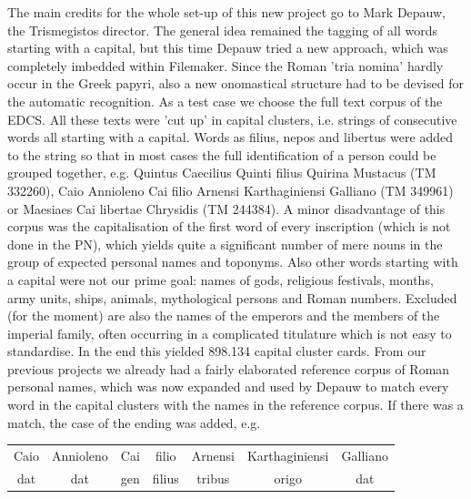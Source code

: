 \documentclass[amsthm,ebook]{saparticle}
\begin{document}
 The main credits for the whole set-up of this new project go to Mark Depauw, the Trismegistos director. The general
idea remained the tagging of all words starting with a capital, but this time Depauw tried a new approach, which was
completely imbedded within Filemaker. Since the Roman 'tria nomina' hardly occur in the Greek papyri, also a new
onomastical structure had to be devised for the automatic recognition. As a test case we choose the full text corpus of
the EDCS. All these texts were 'cut up' in capital clusters, i.e. strings of consecutive words all starting with a
capital. Words as filius, nepos and libertus were added to the string so that in most cases the full identification of
a person could be grouped together, e.g. Quintus Caecilius Quinti filius Quirina Mustacus (TM 332260), Caio Annioleno
Cai filio Arnensi Karthaginiensi Galliano (TM 349961) or Maesiaes Cai libertae Chrysidis (TM 244384). A minor
disadvantage of this corpus was the capitalisation of the first word of every inscription (which is not done in the
PN), which yields quite a significant number of mere nouns in the group of expected personal names and toponyms. Also
other words starting with a capital were not our prime goal: names of gods, religious festivals, months, army units,
ships, animals, mythological persons and Roman numbers. Excluded (for the moment) are also the names of the emperors
and the members of the imperial family, often occurring in a complicated titulature which is not easy to standardise.
In the end this yielded 898.134 capital cluster cards. From our previous projects we already had a fairly elaborated
reference corpus of Roman personal names, which was now expanded and used by Depauw to match every word in the capital
clusters with the names in the reference corpus. If there was a match, the case of the ending was added, e.g.

\begin{table}[htp]
\begin{center}
\begin{tabular}{ccccccc}
Caio & Annioleno & Cai & filio & Arnensi & Karthaginiensi & Galliano\\
dat & dat & gen & filius & tribus & origo & dat\\
\end{tabular}
\end{center}
\label{Example}
\end{table}%
\end{document}
